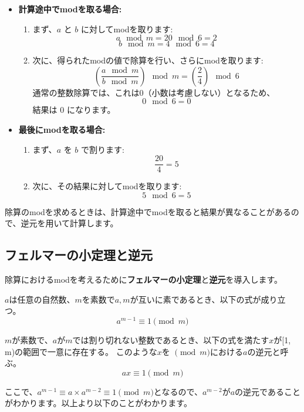 \documentclass{jlreq}
\begin{document}
\begin{itemize}
    \item \textbf{計算途中でmodを取る場合:}
    \begin{enumerate}
        \item まず、\( a \) と \( b \) に対してmodを取ります:
        \[
        a \mod m = 20 \mod 6 = 2
        \]
        \[
        b \mod m = 4 \mod 6 = 4
        \]
        \item 次に、得られたmodの値で除算を行い、さらにmodを取ります:
        \[
        \left(\frac{a \mod m}{b \mod m}\right) \mod m = \left(\frac{2}{4}\right) \mod 6
        \]
        通常の整数除算では、これは0（小数は考慮しない）となるため、
        \[
        0 \mod 6 = 0
        \]
        結果は \( 0 \) になります。
    \end{enumerate}

    \item \textbf{最後にmodを取る場合:}
    \begin{enumerate}
        \item まず、\( a \) を \( b \) で割ります:
        \[
        \frac{20}{4} = 5
        \]
        \item 次に、その結果に対してmodを取ります:
        \[
        5 \mod 6 = 5
        \]
    \end{enumerate}
\end{itemize}

除算のmodを求めるときは、計算途中でmodを取ると結果が異なることがあるので、逆元を用いて計算します。

\subsection{フェルマーの小定理と逆元}

除算におけるmodを考えるために\textbf{フェルマーの小定理}と\textbf{逆元}を導入します。

\begin{tcolorbox}[enhanced,title=フェルマーの小定理, 
    attach boxed title to top left, 
    colback=white!95!blue,
    colbacktitle=white!10!blue!50!black,
    drop fuzzy shadow,
    boxrule=0.25mm,
    ]
    $a$は任意の自然数、$m$を素数で$a, m$が互いに素であるとき、以下の式が成り立つ。
    \begin{equation*}
        a^{m-1} \equiv 1 \pmod{m}
    \end{equation*}
  \end{tcolorbox}

\begin{tcolorbox}[enhanced,title=逆元, 
    attach boxed title to top left, 
    colback=white!95!blue,
    colbacktitle=white!10!blue!50!black,
    drop fuzzy shadow,
    boxrule=0.25mm,
    ]
    $m$が素数で、$a$が$m$では割り切れない整数であるとき、以下の式を満たす$x$が[1, m)の範囲で一意に存在する。
    このような$x$を $\pmod m$における$a$の逆元と呼ぶ。
    \begin{equation*}
        a x \equiv 1 \pmod{m}
    \end{equation*}
  \end{tcolorbox}
  ここで、$a^{m-1} \equiv a \times a^{m-2} \equiv 1 \pmod{m}$となるので、$a^{m-2}$が$a$の逆元であることがわかります。以上より以下のことがわかります。
\end{document}
